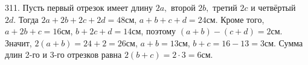 311. Пусть первый отрезок имеет длину $2a,$ второй $2b,$ третий $2c$ и четвёртый $2d.$ Тогда $2a+2b+2c+2d=48$см, $a+b+c+d=24$см. Кроме того, $a+2b+c=16$см, $b+2c+d=14$см, поэтому $(a+b)-(c+d)=2$см. Значит, $2(a+b)=24+2=26$см, $a+b=13$см, $b+c=16-13=3$см. Сумма длин 2-го и 3-го отрезков равна $2(b+c)=2\cdot3=6$см.\\

